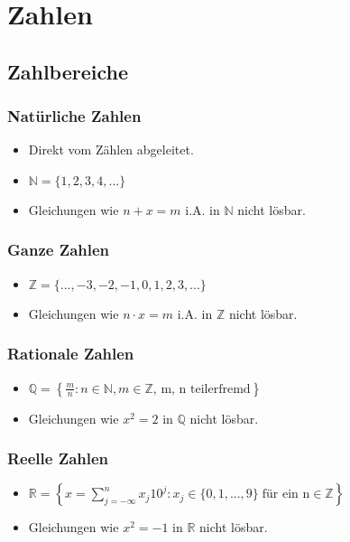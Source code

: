 \documentclass[12pt,a4paper]{article}%
\numberwithin{equation}{section}
\newcommand{\R}{\mathbb{R}} %
\newcommand{\N}{\mathbb{N}}
\newcommand{\Z}{\mathbb{Z}}
\newcommand{\Q}{\mathbb{Q}}
\numberwithin{equation}{subsection}
\begin{document}
\section{Zahlen}
  \subsection{Zahlbereiche}
    \subsubsection{Natürliche Zahlen}
    \begin{itemize}
      \item Direkt vom Zählen abgeleitet.
      \item $\N = \{1, 2, 3, 4, ...\}$
      \item Gleichungen wie $n+x = m$ i.A. in $\N$ nicht lösbar. 
    \end{itemize}

    \subsubsection{Ganze Zahlen}
    \begin{itemize}
      \item $\Z = \{..., -3, -2, -1, 0, 1, 2, 3, ...\}$
      \item Gleichungen wie $n \cdot x = m$ i.A. in $\Z$ nicht lösbar.
    \end{itemize}

    \subsubsection{Rationale Zahlen}
		\begin{itemize} 
			\item $\Q = \left\lbrace \frac{m}{n}: n\in \N, m \in \Z\text{, m, n teilerfremd} \right\rbrace$
			\item Gleichungen wie $x^2 = 2$ in $\Q$ nicht lösbar.
		\end{itemize}

		\subsubsection{Reelle Zahlen}
		\begin{itemize}
			\item $\R = \left\lbrace x = \sum_{j = - \infty}^n x_j 10^j : x_j \in \{0, 1, ..., 9\}\; \text{für ein n} \in \Z \right\rbrace $
			\item Gleichungen wie $x^2 = -1$ in $\R$ nicht lösbar.
		\end{itemize}
\end{document}
